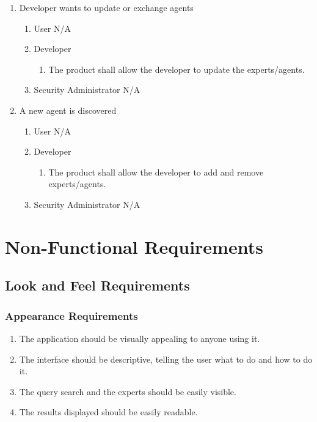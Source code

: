 \documentclass[]{article}
\begin{document}
\begin{enumerate}[{BE}1.]
	\item Developer wants to update or exchange agents
	\begin{enumerate}[{VP5}.1]
		\item User
		\newline N/A

		\item Developer
			\begin{enumerate}
				\item The product shall allow the developer to update the experts/agents.
			\end{enumerate}
		\item Security Administrator
		\newline N/A
	\end{enumerate}
	
	\item A new agent is discovered
	\begin{enumerate}[{VP6}.1]
		\item User
		\newline N/A

		\item Developer
			\begin{enumerate}
				\item The product shall allow the developer to add and remove experts/agents.
			\end{enumerate}
		\item Security Administrator
		\newline N/A
	\end{enumerate}
	
\end{enumerate}



\section{Non-Functional Requirements} \label{nfreq}
\label{sec:non-functional_requirements}
\subsection{Look and Feel Requirements}
\label{sub:look_and_feel_requirements}


\subsubsection{Appearance Requirements}
\label{ssub:appearance_requirements}
\begin{enumerate}[{LF}1. ]
	\item The application should be visually appealing to anyone using it.
	\item The interface should be descriptive, telling the user what to do and how to do it.
	\item The query search and the experts should be easily visible.
	\item The results displayed should be easily readable.
	\setcounter{placeholder}{\theenumi}
\end{enumerate}
\end{document}
